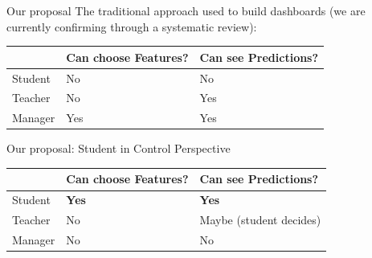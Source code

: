 \begin{frame}{Our proposal}
    The traditional approach used to build dashboards (we are currently confirming through a systematic review):

    \begin{table}[]
        \begin{tabular}{|l|l|l|} \hline
                 & Can choose Features? & Can see Predictions?\\ \hline
         Student & No                   & No                  \\ \hline
         Teacher & No                   & Yes                 \\ \hline
         Manager & Yes                  & Yes                 \\ \hline
        \end{tabular}
    \end{table}

    \pause
    Our proposal: Student in Control Perspective
    \pause
    \begin{table}[]
        \begin{tabular}{|l|l|l|} \hline
                 & Can choose Features? & Can see Predictions?    \\ \hline
         Student & \textbf{Yes}         & \textbf{Yes}            \\ \hline
         Teacher & No                   & Maybe (student decides) \\ \hline
         Manager & No                   & No                      \\ \hline
        \end{tabular}
    \end{table}

\end{frame}

